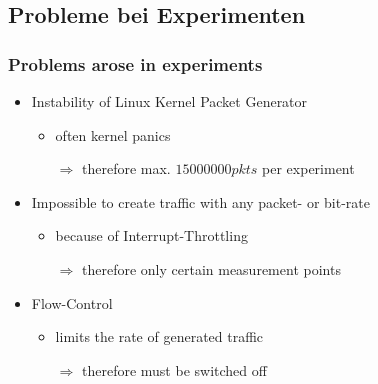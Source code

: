 \documentclass{beamer}
\begin{document}
\subsection*{Probleme bei Experimenten}
\begin{frame}
\frametitle{Problems arose in experiments }
\begin{itemize}
	\item Instability of  Linux Kernel Packet Generator
		\begin{itemize}
			\item often kernel panics
			\item [$\Rightarrow$] therefore max. $15000000 pkts$ per experiment\newline
		\end{itemize}
	\item Impossible to create traffic with any packet- or bit-rate
		\begin{itemize}
			\item because of Interrupt-Throttling
			\item [$\Rightarrow$] therefore only certain measurement points \newline
		\end{itemize}
	\item Flow-Control
		\begin{itemize}
			\item limits the rate of generated traffic
			\item [$\Rightarrow$] therefore must be switched off
		\end{itemize}
\end{itemize}
\end{frame}
\end{document}
